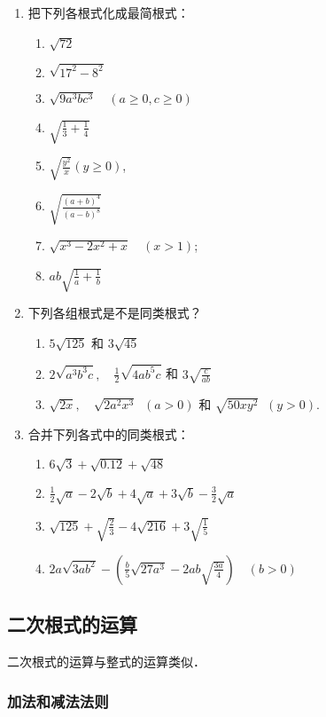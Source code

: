 \begin{ex}
\begin{enumerate}
    \item 把下列各根式化成最简根式：
\begin{enumerate}
    \item $\sqrt{72}$
    \item $\sqrt{17^{2}-8^{2}}$
    \item $\sqrt{9 a^{3} b c^{3}}\quad (a \ge 0, c \ge 0)$
    \item  $\sqrt{\frac{1}{3}+\frac{1}{4}}$
    \item  $\sqrt{\frac{y^{2}}{x}}(y \ge 0)$,
    \item  $\sqrt{\frac{(a+b)^{4}}{(a-b)^{8}}}$
    \item  $\sqrt{x^{3}-2 x^{2}+x}\quad (x>1)$;
    \item $a b \sqrt{\frac{1}{a}+\frac{1}{b}}$
\end{enumerate}
    \item 下列各组根式是不是同类根式？
    \begin{enumerate}
\item $5 \sqrt{125}$ 和 $3 \sqrt{45}$
\item $2 \sqrt{a^{3} b^{3} c},\quad \frac{1}{2} \sqrt{4 a b^{5} c}$ 和 $3 \sqrt{\frac{c}{a b}}$
\item $\sqrt{2 x},\quad \sqrt{2 a^{2} x^{3}}\;\; (a>0)$ 和 $\sqrt{50 x y^{2}}\;\;(y>0)$.
    \end{enumerate}
    \item 合并下列各式中的同类根式：
\begin{enumerate}
    \item $6 \sqrt{3}+\sqrt{0.12}+\sqrt{48}$
    \item $\frac{1}{2} \sqrt{a}- 2 \sqrt{b}+4 \sqrt{a}+3 \sqrt{b}-\frac{3}{2} \sqrt{a}$
    \item $\sqrt{125}+\sqrt{\frac{2}{3}}-4 \sqrt{216}+3 \sqrt{\frac{1}{5}}$
    \item $2 a \sqrt{3 a b^{2}}-\left(\frac{b}{5} \sqrt{27 a^{3}}-2 a b \sqrt{\frac{3a}{4}}\right)\quad (b>0)$
\end{enumerate}
\end{enumerate}
\end{ex}

\subsection{二次根式的运算}
二次根式的运算与整式的运算类似．

\subsubsection{加法和减法法则}

